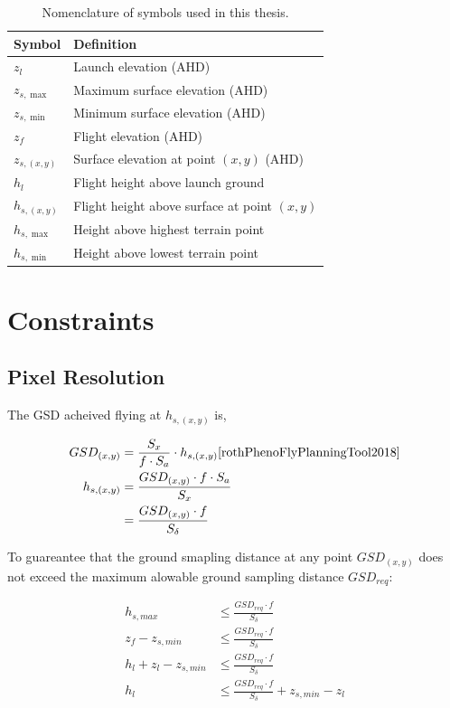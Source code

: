 \documentclass[11pt]{article}
\begin{document}
\begin{table}[hbt]
  \centering
  \begin{tabular}{ll}
    \hline
    \textbf{Symbol} & \textbf{Definition} \\
    \hline
    $z_l$            & Launch elevation (AHD) \\
    $z_{s,\max}$     & Maximum surface elevation (AHD) \\
    $z_{s,\min}$     & Minimum surface elevation (AHD) \\
    $z_f$            & Flight elevation (AHD) \\
    $z_{s,(x,y)}$    & Surface elevation at point $(x,y)$ (AHD) \\
    $h_l$            & Flight height above launch ground \\
    $h_{s,(x,y)}$    & Flight height above surface at point $(x,y)$ \\
    $h_{s,\max}$     & Height above highest terrain point \\
    $h_{s,\min}$     & Height above lowest terrain point \\
    \hline
  \end{tabular}
  \caption{Nomenclature of symbols used in this thesis.}
  \label{tab:ElevationNomenclature}
\end{table}

\section{Constraints}
\label{sec:FlightHeight}

\subsection{Pixel Resolution}

The GSD acheived flying at $h_{s,(x,y)}$ is,

\begin{align}
    GSD_{(x,y)} &= \frac{S_x}{f \cdot S_a} \cdot h_{s,(x,y)} \cite{rothPhenoFlyPlanningTool2018}\\
    h_{s,(x,y)} &= \frac{GSD_{(x,y)} \cdot f \cdot S_a}{S_x} \\
    &= \frac{GSD_{(x,y)} \cdot f }{S_\delta}
\end{align}

\noindent
To guareantee that the ground smapling distance at any point $GSD_{(x,y)}$ does not exceed the maximum alowable ground sampling distance $GSD_{req}$:

\begin{align}
    h_{s,max} &\leq \frac{GSD_{req} \cdot f }{S_\delta}\\
    z_f - z_{s,min} &\leq \frac{GSD_{req} \cdot f }{S_\delta}\\
    h_l + z_l - z_{s,min} &\leq \frac{GSD_{req} \cdot f }{S_\delta}\\
    h_l &\leq \frac{GSD_{req} \cdot f }{S_\delta} + z_{s,min} - z_l
\end{align}
\end{document}
